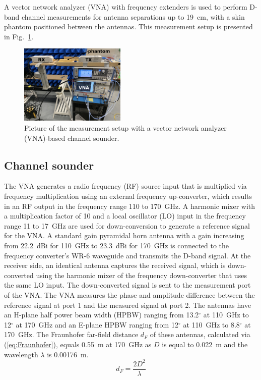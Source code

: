 \documentclass[preprint]{rsl}
\begin{document}
A vector network analyzer (VNA) with frequency extenders is used to perform D-band channel measurements for antenna separations up to 19~cm, with a skin phantom positioned between the antennas. 
This measurement setup is presented in Fig.~\ref{fig:sounder_setup}.
\begin{figure}[tb]
\begin{center}
	\includegraphics[width=0.45\textwidth]{figures/measurement_setup}
\caption{Picture of the measurement setup with a vector network analyzer (VNA)-based channel sounder.}
\label{fig:sounder_setup}
\end{center}
\end{figure}

\subsection{Channel sounder}

The VNA generates a radio frequency (RF) source input that is multiplied via frequency multiplication using an external frequency up-converter, which results in an RF output in the frequency range 110 to 170~GHz. 
A harmonic mixer with a multiplication factor of 10 and a local oscillator (LO) input in the frequency range 11 to 17~GHz are used for down-conversion to generate a reference signal for the VNA. 
A standard gain pyramidal horn antenna with a gain increasing from 22.2~dBi for 110~GHz  to 23.3~dBi for 170~GHz is connected to the frequency converter's WR-6 waveguide and transmits the D-band signal.
At the receiver side, an identical antenna captures the received signal, which is down-converted using the harmonic mixer of the frequency down-converter that uses the same LO input. 
The down-converted signal is sent to the measurement port of the VNA. 
The VNA measures the phase and amplitude difference between the reference signal at port 1 and the measured signal at port 2.
The antennas have an H-plane half power beam width (HPBW) ranging from 13.2$^{\circ}$ at 110~GHz to 12$^{\circ}$ at 170~GHz and an E-plane HPBW ranging from 12$^{\circ}$ at 110~GHz to 8.8$^{\circ}$ at 170~GHz. 
The Fraunhofer far-field distance $d_F$ of these antennas, calculated via (\ref{eq:Fraunhofer}), equals 0.55~m at 170~GHz as $D$ is equal to 0.022~m and the wavelength $\lambda$ is 0.00176~m.
\begin{equation}
\label{eq:Fraunhofer}
d_F = \frac{2 D^2}{\lambda}
\end{equation}
\end{document}
